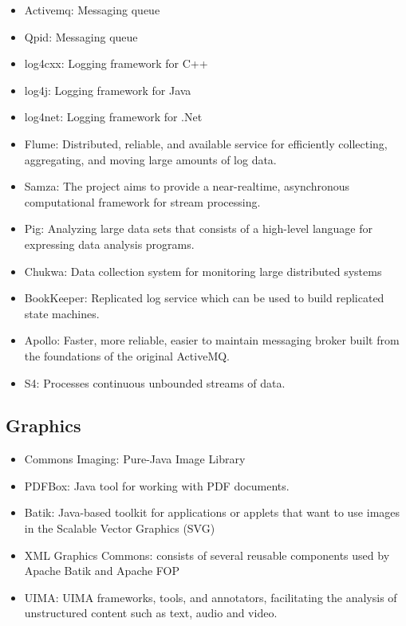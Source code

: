 \documentclass[12pt]{report}
\providecommand{\tightlist}{%
  \setlength{\itemsep}{0pt}\setlength{\parskip}{0pt}}
\begin{document}
\begin{itemize}
\tightlist
\item
  Activemq: Messaging queue
\item
  Qpid: Messaging queue
\item
  log4cxx: Logging framework for C++
\item
  log4j: Logging framework for Java
\item
  log4net: Logging framework for .Net
\item
  Flume: Distributed, reliable, and available service for efficiently
  collecting, aggregating, and moving large amounts of log data.
\item
  Samza: The project aims to provide a near-realtime, asynchronous
  computational framework for stream processing.
\item
  Pig: Analyzing large data sets that consists of a high-level language
  for expressing data analysis programs.
\item
  Chukwa: Data collection system for monitoring large distributed
  systems
\item
  BookKeeper: Replicated log service which can be used to build
  replicated state machines.
\item
  Apollo: Faster, more reliable, easier to maintain messaging broker
  built from the foundations of the original ActiveMQ.
\item
  S4: Processes continuous unbounded streams of data.
\end{itemize}

\subsection{Graphics}\label{graphics}

\begin{itemize}
\tightlist
\item
  Commons Imaging: Pure-Java Image Library
\item
  PDFBox: Java tool for working with PDF documents.
\item
  Batik: Java-based toolkit for applications or applets that want to use
  images in the Scalable Vector Graphics (SVG)
\item
  XML Graphics Commons: consists of several reusable components used by
  Apache Batik and Apache FOP
\item
  UIMA: UIMA frameworks, tools, and annotators, facilitating the
  analysis of unstructured content such as text, audio and video.
\end{itemize}
\end{document}
